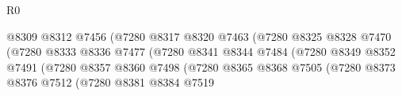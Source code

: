 \begin{lexlean}{R0}
\begin{coremodule}
                                                    @8309
                                                    @8312
                                                    @7456
                                                    (@7280
                                                      @8317
                                                      @8320
                                                      @7463
                                                      (@7280
                                                        @8325
                                                        @8328
                                                        @7470
                                                        (@7280
                                                          @8333
                                                          @8336
                                                          @7477
                                                          (@7280
                                                            @8341
                                                            @8344
                                                            @7484
                                                            (@7280
                                                              @8349
                                                              @8352
                                                              @7491
                                                              (@7280
                                                                @8357
                                                                @8360
                                                                @7498
                                                                (@7280
                                                                  @8365
                                                                  @8368
                                                                  @7505
                                                                  (@7280
                                                                    @8373
                                                                    @8376
                                                                    @7512
                                                                    (@7280
                                                                      @8381
                                                                      @8384
                                                                      @7519

\end{coremodule}
\end{lexlean}
